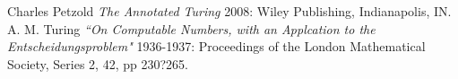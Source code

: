 \documentclass[11pt]{article}
\begin{document}







%
%


  \begin{thebibliography}{1}

   Charles Petzold {\em The Annotated Turing
  }  2008: Wiley Publishing, Indianapolis, IN.
 A. M. Turing {\em ``On Computable Numbers, with an Applcation to the Entscheidungsproblem"} 1936-1937: Proceedings of the London Mathematical Society, Series 2, 42, pp 230?265.


  \end{thebibliography}
\end{document}
